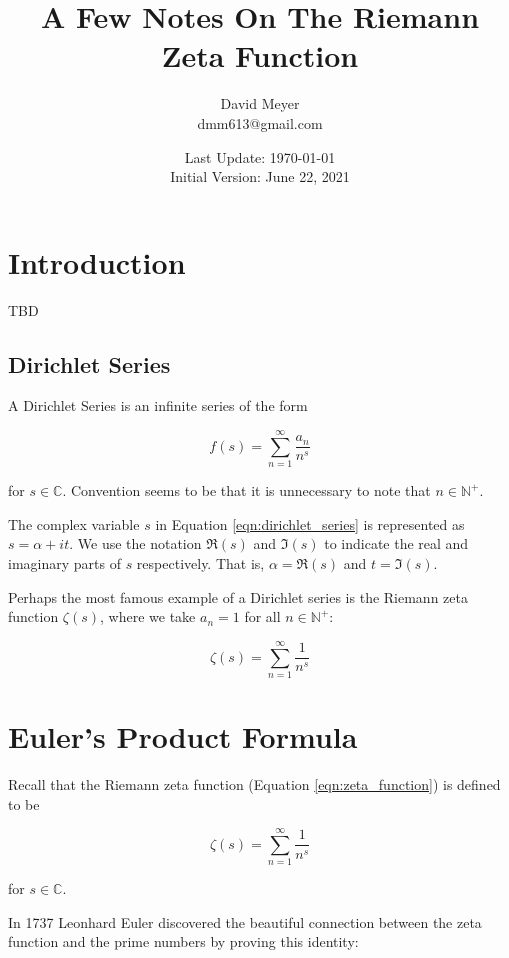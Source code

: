 \documentclass[11pt, oneside]{article}   	%
\title{A Few Notes On The Riemann Zeta Function}
\author{David Meyer \\ dmm613@gmail.com}
\date{Last Update: \today \\
	 {\vspace{1.00mm} \small Initial Version: June 22, 2021}}
\theoremstyle{definition}
\begin{document}
\maketitle

\section{Introduction}
TBD

\subsection{Dirichlet Series}
A Dirichlet Series \cite{mccarthy2018} is an infinite series of the form

\bigskip
\begin{equation}
f(s) = \sum\limits_{n = 1}^{\infty} \frac{a_n}{n^s}
\label{eqn:dirichlet_series}
\end{equation}

\bigskip
\noindent
for $s \in \mathbb{C}$. Convention seems to be that it is unnecessary to note that $n \in \mathbb{N}^+$.  

\bigskip
\noindent
The complex variable $s$ in Equation \ref{eqn:dirichlet_series} is represented as $s = \alpha + i t$. We use the 
notation $ \Re(s)$ and $\Im(s)$ to indicate the real and imaginary parts of $s$ respectively. That is, 
$\alpha = \Re(s)$ and $t = \Im(s)$.


\bigskip
\noindent
Perhaps the most famous example of a Dirichlet series is the Riemann zeta function $\zeta(s)$, where
we take $a_n = 1$ for all $n \in \mathbb{N}^+$:


\bigskip
\begin{equation}
\zeta(s) = \sum^\infty_{n = 1} \frac{1}{n^s}
\label{eqn:zeta_function}
\end{equation}

\bigskip
\section{Euler's Product Formula}
Recall that the Riemann zeta function (Equation \ref{eqn:zeta_function}) is defined to be

\medskip
\begin{equation*}
\zeta(s) = \sum^\infty_{n = 1} \frac{1}{n^s}
\end{equation*}

\noindent
for $s \in \mathbb{C}$.

\bigskip
\noindent
In 1737 Leonhard Euler \cite{euler_product_formula} discovered the beautiful connection between the zeta function and the prime numbers by proving this identity:
\end{document}
